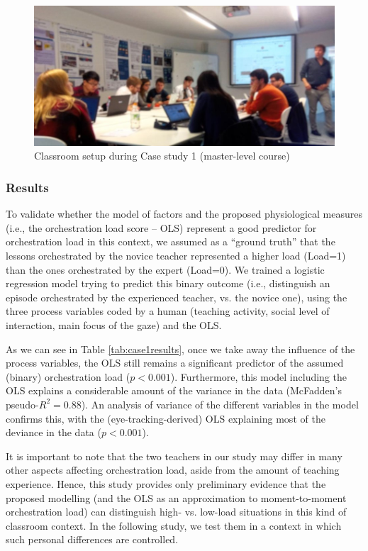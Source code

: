 \documentclass[10pt,journal,compsoc]{IEEEtran}
\begin{document}
\begin{figure}[!t]
\centering
\includegraphics[width=\linewidth]{img/Case1Picture}
\caption{Classroom setup during Case study 1 (master-level course)}
\label{fig:case1picture}
\end{figure}

\subsubsection{Results}

To validate whether the model of factors and the proposed physiological measures (i.e., the orchestration load score -- OLS) represent a good predictor for orchestration load in this context, we assumed as a ``ground truth'' that the lessons orchestrated by the novice teacher represented a higher load (Load=1) than the ones orchestrated by the expert (Load=0). We trained a logistic regression model trying to predict this binary outcome (i.e., distinguish an episode orchestrated by the experienced teacher, vs. the novice one), using the three process variables coded by a human (teaching activity, social level of interaction, main focus of the gaze) and the OLS. 

As we can see in Table \ref{tab:case1results}, once we take away the influence of the process variables, the OLS still remains a significant predictor of the assumed (binary) orchestration load ($p<0.001$). Furthermore, this model including the OLS explains a considerable amount of the variance in the data (McFadden's pseudo-$R^2=0.88$). An analysis of variance of the different variables in the model confirms this, with the (eye-tracking-derived) OLS explaining most of the deviance in the data ($p<0.001$). %

It is important to note that the two teachers in our study may differ in many other aspects affecting orchestration load, aside from the amount of teaching experience. Hence, this study provides only preliminary evidence that the proposed modelling (and the OLS as an approximation to moment-to-moment orchestration load) can distinguish high- vs. low-load situations in this kind of classroom context. In the following study, we test them in a context in which such personal differences are controlled.
\end{document}
